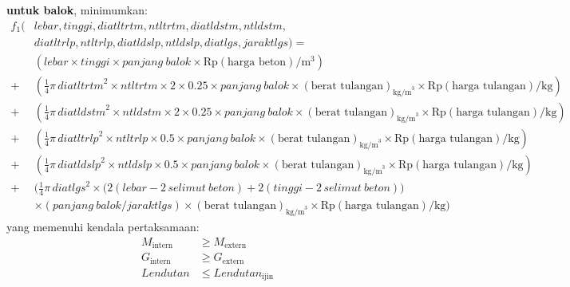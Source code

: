 \medskip\noindent
\textbf{untuk balok}, minimumkan:
\begingroup\footnotesize
\begin{equation}
\begin{aligned}
f_1(&\mathit{lebar}, \mathit{tinggi}, \mathit{diatltrtm}, \mathit{ntltrtm}, \mathit{diatldstm}, \mathit{ntldstm},\\
    &\mathit{diatltrlp}, \mathit{ntltrlp}, \mathit{diatldslp}, \mathit{ntldslp}, \mathit{diatlgs}, \mathit{jaraktlgs}) =\\[2pt]
  &(\mathit{lebar} \times \mathit{tinggi} \times \mathit{panjang\ balok} \times \mathrm{Rp}(\text{harga beton})/\mathrm{m}^3)\\
 +&\left(\tfrac14 \pi\, \mathit{diatltrtm}^2 \times \mathit{ntltrtm} \times 2 \times 0.25 \times \mathit{panjang\ balok} \times (\text{berat tulangan})_{\mathrm{kg/m}^3} \times \mathrm{Rp}(\text{harga tulangan})/\mathrm{kg}\right)\\
 +&\left(\tfrac14 \pi\, \mathit{diatldstm}^2 \times \mathit{ntldstm} \times 2 \times 0.25 \times \mathit{panjang\ balok} \times (\text{berat tulangan})_{\mathrm{kg/m}^3} \times \mathrm{Rp}(\text{harga tulangan})/\mathrm{kg}\right)\\
 +&\left(\tfrac14 \pi\, \mathit{diatltrlp}^2 \times \mathit{ntltrlp} \times 0.5 \times \mathit{panjang\ balok} \times (\text{berat tulangan})_{\mathrm{kg/m}^3} \times \mathrm{Rp}(\text{harga tulangan})/\mathrm{kg}\right)\\
 +&\left(\tfrac14 \pi\, \mathit{diatldslp}^2 \times \mathit{ntldslp} \times 0.5 \times \mathit{panjang\ balok} \times (\text{berat tulangan})_{\mathrm{kg/m}^3} \times \mathrm{Rp}(\text{harga tulangan})/\mathrm{kg}\right)\\
 +&\Big(\tfrac14 \pi\, \mathit{diatlgs}^2 \times \big(2(\mathit{lebar} - 2\,\mathit{selimut\ beton}) + 2(\mathit{tinggi} - 2\,\mathit{selimut\ beton})\big)\\
   &\times (\mathit{panjang\ balok}/\mathit{jaraktlgs}) \times (\text{berat tulangan})_{\mathrm{kg/m}^3} \times \mathrm{Rp}(\text{harga tulangan})/\mathrm{kg}\Big)
\end{aligned}
\label{eq:1-4}
\end{equation}
\endgroup
yang memenuhi kendala pertaksamaan:
\begin{align}
M_{\text{intern}} &\geq M_{\text{extern}} \label{eq:1-5}\\
G_{\text{intern}} &\geq G_{\text{extern}} \label{eq:1-6}\\
\mathit{Lendutan} &\leq \mathit{Lendutan}_{\text{ijin}} \label{eq:1-7}
\end{align}

